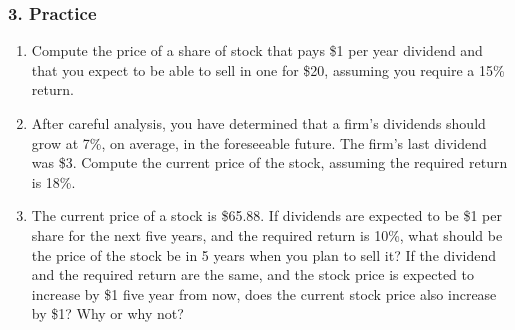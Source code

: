 \documentclass{beamer}
\begin{document}
\begin{practiceframe}[t]
    \frametitle{3. Practice}

\begin{enumerate}
    \item Compute the price of a share of stock that pays \$1 per year dividend and that you expect to be able to sell in one for \$20, assuming you require a 15\% return.
    \item After careful analysis, you have determined that a firm’s dividends should grow at 7\%, on average, in the foreseeable future.   The firm’s last dividend was \$3.  Compute the current price of the stock, assuming the required return is 18\%.
    \item The current price of a stock is \$65.88.   If dividends are expected to be \$1 per share for the next five years, and the required return is 10\%, what should be the price of the stock be in 5 years when you plan to sell it?   If the dividend and the required return are the same, and the stock price is expected to increase by \$1 five year from now, does the current stock price also increase by \$1?  Why or why not?
\end{enumerate}




\end{practiceframe}
\end{document}
